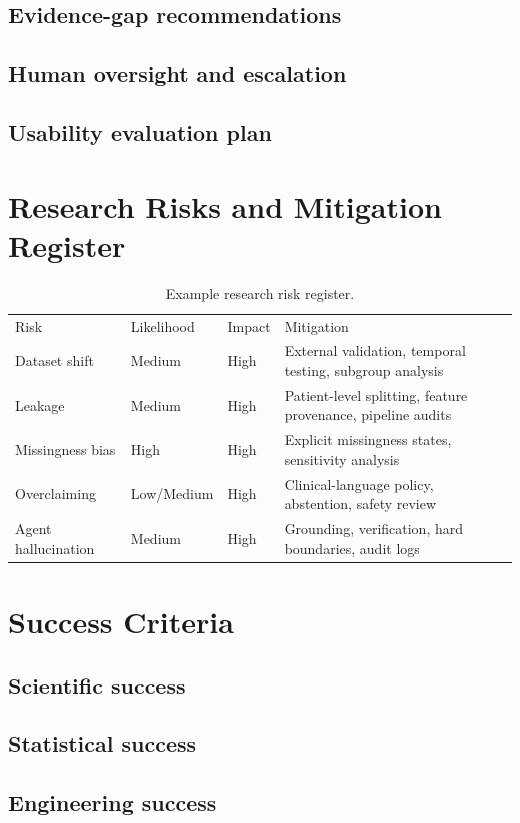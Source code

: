 \documentclass[11pt,journal,onecolumn,draftclsnofoot]{IEEEtran}
\begin{document}
\subsection{Evidence-gap recommendations}
\subsection{Human oversight and escalation}
\subsection{Usability evaluation plan}

\section{Research Risks and Mitigation Register}
\begin{table}[H]
\centering
\caption{Example research risk register.}
\label{tab:risk-register}
\begin{tabularx}{\textwidth}{@{}p{}p{}p{}X@{}}
Risk & Likelihood & Impact & Mitigation \\
Dataset shift & Medium & High & External validation, temporal testing, subgroup analysis \\
Leakage & Medium & High & Patient-level splitting, feature provenance, pipeline audits \\
Missingness bias & High & High & Explicit missingness states, sensitivity analysis \\
Overclaiming & Low/Medium & High & Clinical-language policy, abstention, safety review \\
Agent hallucination & Medium & High & Grounding, verification, hard boundaries, audit logs \\
\end{tabularx}
\end{table}

\section{Success Criteria}
\subsection{Scientific success}
\subsection{Statistical success}
\subsection{Engineering success}
\end{document}
